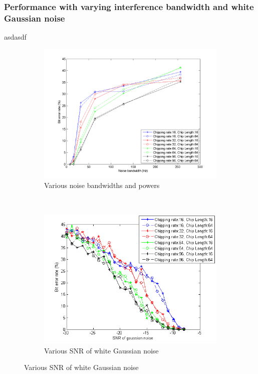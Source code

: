 		
		\subsubsection{Performance with varying interference bandwidth and white Gaussian noise}
		asdasdf
	
		\begin{figure}[H]
			\centering
			\begin{subfigure}[b]{0.5\textwidth}
				\includegraphics[width=\textwidth]{imgs/results/plot_mode_dsss-test_bandwidthAndPower-rep_20-dataRate_8-dataLength_128.png}
				\caption{Various noise bandwidths and powers}
				\label{fig:dsss_bandwidth}
			\end{subfigure}%
			~
			\begin{subfigure}[b]{0.5\textwidth}
				\includegraphics[width=\textwidth]{imgs/results/plot_mode_dsss-test_gaussianSNR-rep_20-dataRate_8-dataLength_128_fixedlegend.png}
				\caption{Various SNR of white Gaussian noise}
				\label{fig:dsss_gaussian}
			\end{subfigure}
		\end{figure}		
		
